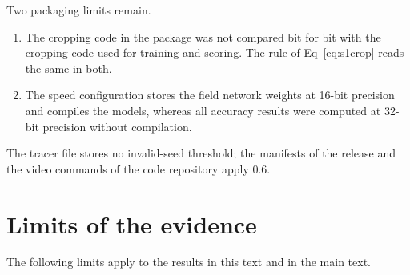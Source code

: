 Two packaging limits remain.
\begin{enumerate}
\item The cropping code in the package was not compared bit for bit with the cropping code used for training and scoring. The rule of Eq~\ref{eq:s1crop} reads the same in both.
\item The speed configuration stores the field network weights at 16-bit precision and compiles the models, whereas all accuracy results were computed at 32-bit precision without compilation.
\end{enumerate}
The tracer file stores no invalid-seed threshold; the manifests of the release and the video commands of the code repository apply 0.6.

\section*{Limits of the evidence}

The following limits apply to the results in this text and in the main text.

